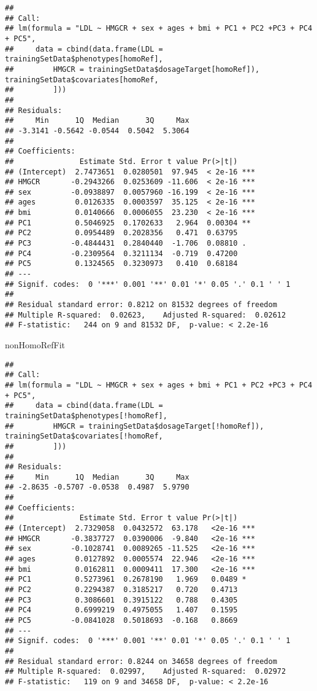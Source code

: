 \documentclass[]{article}
\newenvironment{Shaded}{\begin{snugshade}}{\end{snugshade}}
\newcommand{\NormalTok}[1]{#1}
\begin{document}
\begin{verbatim}
## 
## Call:
## lm(formula = "LDL ~ HMGCR + sex + ages + bmi + PC1 + PC2 +PC3 + PC4 + PC5", 
##     data = cbind(data.frame(LDL = trainingSetData$phenotypes[homoRef], 
##         HMGCR = trainingSetData$dosageTarget[homoRef]), trainingSetData$covariates[homoRef, 
##         ]))
## 
## Residuals:
##     Min      1Q  Median      3Q     Max 
## -3.3141 -0.5642 -0.0544  0.5042  5.3064 
## 
## Coefficients:
##               Estimate Std. Error t value Pr(>|t|)    
## (Intercept)  2.7473651  0.0280501  97.945  < 2e-16 ***
## HMGCR       -0.2943266  0.0253609 -11.606  < 2e-16 ***
## sex         -0.0938897  0.0057960 -16.199  < 2e-16 ***
## ages         0.0126335  0.0003597  35.125  < 2e-16 ***
## bmi          0.0140666  0.0006055  23.230  < 2e-16 ***
## PC1          0.5046925  0.1702633   2.964  0.00304 ** 
## PC2          0.0954489  0.2028356   0.471  0.63795    
## PC3         -0.4844431  0.2840440  -1.706  0.08810 .  
## PC4         -0.2309564  0.3211134  -0.719  0.47200    
## PC5          0.1324565  0.3230973   0.410  0.68184    
## ---
## Signif. codes:  0 '***' 0.001 '**' 0.01 '*' 0.05 '.' 0.1 ' ' 1
## 
## Residual standard error: 0.8212 on 81532 degrees of freedom
## Multiple R-squared:  0.02623,    Adjusted R-squared:  0.02612 
## F-statistic:   244 on 9 and 81532 DF,  p-value: < 2.2e-16
\end{verbatim}

\begin{Shaded}
\begin{Highlighting}[]
\NormalTok{nonHomoRefFit}
\end{Highlighting}
\end{Shaded}

\begin{verbatim}
## 
## Call:
## lm(formula = "LDL ~ HMGCR + sex + ages + bmi + PC1 + PC2 +PC3 + PC4 + PC5", 
##     data = cbind(data.frame(LDL = trainingSetData$phenotypes[!homoRef], 
##         HMGCR = trainingSetData$dosageTarget[!homoRef]), trainingSetData$covariates[!homoRef, 
##         ]))
## 
## Residuals:
##     Min      1Q  Median      3Q     Max 
## -2.8635 -0.5707 -0.0538  0.4987  5.9790 
## 
## Coefficients:
##               Estimate Std. Error t value Pr(>|t|)    
## (Intercept)  2.7329058  0.0432572  63.178   <2e-16 ***
## HMGCR       -0.3837727  0.0390006  -9.840   <2e-16 ***
## sex         -0.1028741  0.0089265 -11.525   <2e-16 ***
## ages         0.0127892  0.0005574  22.946   <2e-16 ***
## bmi          0.0162811  0.0009411  17.300   <2e-16 ***
## PC1          0.5273961  0.2678190   1.969   0.0489 *  
## PC2          0.2294387  0.3185217   0.720   0.4713    
## PC3          0.3086601  0.3915122   0.788   0.4305    
## PC4          0.6999219  0.4975055   1.407   0.1595    
## PC5         -0.0841028  0.5018693  -0.168   0.8669    
## ---
## Signif. codes:  0 '***' 0.001 '**' 0.01 '*' 0.05 '.' 0.1 ' ' 1
## 
## Residual standard error: 0.8244 on 34658 degrees of freedom
## Multiple R-squared:  0.02997,    Adjusted R-squared:  0.02972 
## F-statistic:   119 on 9 and 34658 DF,  p-value: < 2.2e-16
\end{verbatim}
\end{document}
